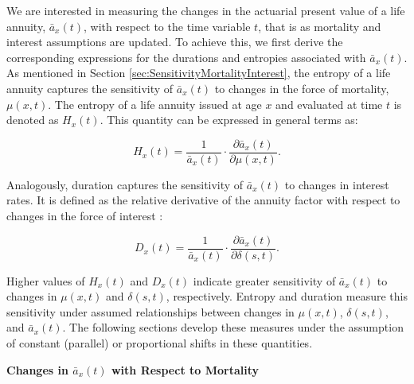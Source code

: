 \documentclass[12pt]{article}
\begin{document}
We are interested in measuring the changes in the actuarial present value of a life annuity, \( \bar{a}_x(t) \), with respect to the time variable \( t \), that is as mortality and interest assumptions are updated. To achieve this, we first derive the corresponding expressions for the durations and entropies associated with \( \bar{a}_x(t) \). As mentioned in Section \ref{sec:SensitivityMortalityInterest}, the entropy of a life annuity captures the sensitivity of \( \bar{a}_x(t) \) to changes in the force of mortality, \( \mu(x,t) \). The entropy of a life annuity issued at age \( x \) and evaluated at time \( t \) is denoted as \( H_x(t) \). This quantity can be expressed in general terms as:

\begin{equation}\label{eq:EntropyGeneral}
{H}_{x}(t) = \frac{ 1}{\bar{a}_x(t)}\cdot \frac{\partial \bar{a}_x(t) }{\partial \mu(x,t)}.
\end{equation}

Analogously, duration captures the sensitivity of $\bar{a}_x(t)$ to changes in interest rates. It is defined as the relative derivative of the annuity factor with respect to changes in the force of interest \citep{Milevsky2012,Milevsky2012a}:


\begin{equation}\label{eq:DurationGeneral}
{D}_{x}(t) = \frac{1}{\bar{a}_x(t)}\cdot  \frac{\partial \bar{a}_x(t) }{\partial \delta(s,t)}.
\end{equation}


Higher values of ${H}_{x}(t)$ and ${D}_{x}(t)$ indicate greater sensitivity of $\bar{a}_x(t)$ to changes in $\mu(x,t)$ and $\delta(s,t)$, respectively. Entropy and duration measure this sensitivity under assumed relationships between changes in $\mu(x,t)$, $\delta(s,t)$, and $\bar{a}_x(t)$. The following sections develop these measures under the assumption of constant (parallel) or proportional shifts in these quantities.

\textbf{{Changes in $\bar{a}_x(t)$ with Respect to Mortality}}
\end{document}

